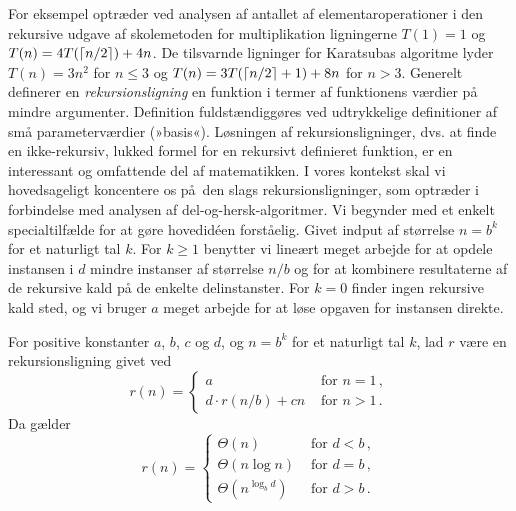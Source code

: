 For eksempel optræder ved analysen af antallet af elementaroperationer i den rekursive udgave af skolemetoden for multiplikation ligningerne
 $T(1)=1$ og $T(n)=4T(\lceil n/2\rceil)+4n$.
De tilsvarnde ligninger for Karatsubas algoritme lyder
$T(n)=3n^2$ for $n \le 3$ og 
$T(n)=3T(\lceil n/2\rceil + 1)+8n$ for $n > 3$.
Generelt definerer en \emph{rekursionsligning} en funktion i termer af funktionens værdier på mindre argumenter.
Definition fuldstændiggøres ved udtrykkelige definitioner af små parameterværdier (»basis«). 
Løsningen af rekursionsligninger, dvs. at finde en ikke-rekursiv, lukked formel for en rekursivt definieret funktion, er en interessant og omfattende del af matematikken.
I vores kontekst skal vi hovedsageligt koncentere os på den slags rekursionsligninger, som optræder i forbindelse med analysen af del-og-hersk-algoritmer.
Vi begynder med et enkelt specialtilfælde for at gøre hovedidéen forståelig.
Givet indput af størrelse $n=b^k$ for et naturligt tal $k$.
For $k \ge 1$ benytter vi lineært meget arbejde for at opdele instansen i $d$ mindre instanser af størrelse $n/b$ og for at kombinere resultaterne af de rekursive kald på de enkelte delinstanster.
For $k=0$ finder ingen rekursive kald sted, og vi bruger $a$ meget arbejde for at løse opgaven for instansen direkte.

\begin{thm}
For positive konstanter $a$, $b$, $c$ og $d$, og $n=b^k$ for et naturligt tal $k$, lad $r$ være en rekursionsligning givet ved
\[ r(n)=
\begin{cases}
a & \text{ for }n=1\,,\\
d \cdot r(n/b) + cn & \text{ for } n > 1 \,.
\end{cases} \]
Da gælder
\[ r(n)=
\begin{cases}
\Theta(n) & \text{ for }d<b\,,\\
\Theta(n\log n) & \text{ for }d=b\,,\\
\Theta(n^{\log_bd}) & \text{ for }d>b \,.
\end{cases} \]
\end{thm}

